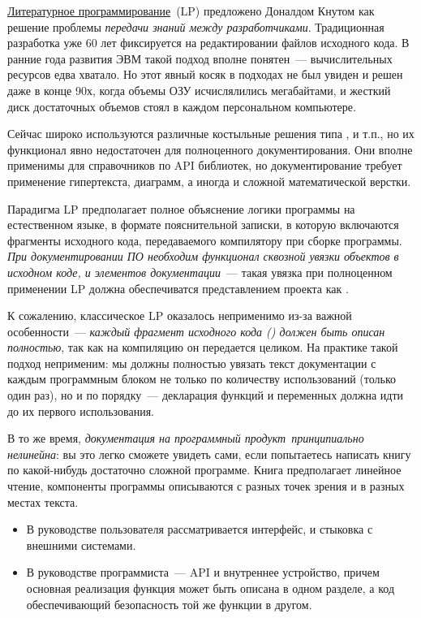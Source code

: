 \clearpage
{}\label{litprog}

\href{https://en.wikipedia.org/wiki/Literate_programming}{Литературное
программирование}\ (LP) предложено Доналдом Кнутом как решение проблемы
\emph{передачи знаний между разработчиками}. Традиционная разработка уже 60 лет
фиксируется на редактировании файлов исходного кода. В ранние года развития ЭВМ
такой подход вполне понятен\ --- вычислительных ресурсов едва хватало. Но этот
явный косяк в подходах не был увиден и решен даже в конце 90х, когда объемы
ОЗУ исчислялились мегабайтами, и жесткий диск достаточных объемов стоял в каждом
персональном компьютере.

Сейчас широко используются различные костыльные решения типа ,
 и т.п., но их функционал явно недостаточен для полноценного
документирования. Они вполне применимы для справочников по API библиотек, но
документирование требует применение гипертекста, диаграмм, а иногда и сложной
математической верстки.

Парадигма LP предполагает полное объяснение логики программы на естественном
языке, в формате пояснительной записки, в которую включаются фрагменты исходного
кода, передаваемого компилятору при сборке программы. \emph{При документировании
ПО необходим функционал сквозной увязки объектов в исходном коде, и элементов
документации}\ --- такая увязка при полноценном применении LP должна
обеспечиватся представлением проекта как .

К сожалению, классическое LP оказалось неприменимо из-за важной особенности\ ---
\emph{каждый фрагмент исходного кода () должен быть описан
полностью}, так как на компиляцию он передается целиком. На практике такой
подход неприменим: мы должны полностью увязать текст документации с каждым
программным блоком не только по количеству использований (только один раз), но и
по порядку\ --- декларация функций и переменных должна идти до их первого
использования.

В то же время, \emph{документация на программный продукт\ принципиально нелинейна}: вы это легко сможете
увидеть сами, если попытаетесь написать книгу по какой-нибудь достаточно сложной
программе. Книга предполагает линейное чтение, компоненты программы описываются
с разных точек зрения и в разных местах текста.
\begin{itemize}[nosep]
\item
В руководстве пользователя рассматривается интерфейс, и стыковка с внешними
системами.
\item
В руководстве программиста\ --- API и внутреннее устройство, причем основная
реализация функция может быть описана в одном разделе, а код обеспечивающий
безопасность той же функции в другом.
\end{itemize}

